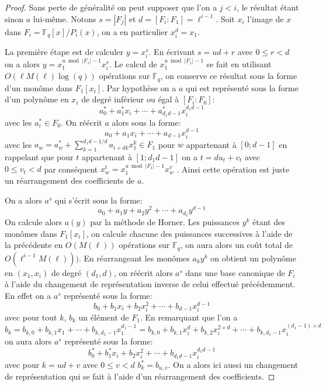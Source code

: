 \documentclass[10pt,a4paper]{book}
\theoremstyle{plain}
\theoremstyle{definition}
\theoremstyle{definition}
\theoremstyle{definition}
\theoremstyle{definition}
\theoremstyle{remark}
\theoremstyle{remark}
\begin{document}
\begin{proof}
Sans perte de généralité on peut supposer que l'on a $j<i$, le résultat étant sinon $a$ lui-même. Notons $s= |F_j|$ et $d=[F_i:F_1]=\ell^{i-1}$. Soit $x_i$ l'image de $x$ dans $F_i=\mathbb{F}_q[x]/P_i(x)$, on a en particulier $x_i^d=x_1$.

La première étape est de calculer $y=x_i^s$. En écrivant $s=ud+r$ avec $0 \leqslant r < d$ on a alors $y=x_1^{u \bmod |F_1|-1}x_i^r$. Le calcul de $x_1^{u \bmod |F_1|-1}$ se fait en utilisant $O(\ell M(\ell) \log(q))$ opérations sur $\mathbb{F}_q$, on conserve ce résultat sous la forme d'un monôme dans $F_1[x_i]$. Par hypothèse on a $a$ qui est représenté sous la forme d'un polynôme en $x_i$ de degré inférieur ou égal à $[F_i:F_0]$: 
\begin{equation*}
a^*_0+a_1^*x_i+ \cdots + a^*_{d_1d-1}x_i^{d_1d-1}
\end{equation*}
avec les $a_i^* \in F_0$. On réécrit $a$ alors sous la forme:
\begin{equation*}
a_0+a_1x_i+ \cdots + a_{d-1}x_i^{d-1}
\end{equation*}
avec les $a_w=a_w^* + \sum_{k=1}^{d_1d-1/d}a_{i+dk}x_1^k \in F_1$ pour $w$ appartenant à $[0; d-1]$ en rappelant que pour $t$ appartenant à $[1; d_1d-1]$ on a $t=d u_t+v_t$ avec $0 \leqslant v_t<d$ par conséquent $x_w^t=x_1^{u \bmod |F_1|-1}x_w^{v}$ . Ainsi cette opération est juste un réarrangement des coefficients de $a$.

On a alors $a^s$ qui s'écrit sous la forme:
\begin{equation*}
a_0 + a_1 y + a_2 y^2 + \cdots + a_{d_1}y^{d-1}
\end{equation*}
On calcule alors $a(y)$ par la méthode de Horner. Les puissances $y^k$ étant des monômes dans $F_1[x_i]$, on calcule chacune des puissances successives à l'aide de la précédente en $O(M(\ell))$ opérations sur $\mathbb{F}_q$, on aura alors un coût total de $O(\ell^{i-1}M(\ell)))$. En réarrangeant les monômes $a_k y^k$ on obtient un polynôme en $(x_1,x_i)$ de degré $(d_1,d)$, on réécrit alors $a^s$ dans une base canonique de $F_i$ à l'aide du changement de représentation inverse de celui effectué précédemment. En effet on a $a^s$ représenté sous la forme:
\begin{equation*}
b_0 + b_1 x_i + b_2 x_i^2 + \cdots + b_{d-1}x_i^{d-1}
\end{equation*}
avec pour tout $k$, $b_k$ un élément de $F_1$. En remarquant que l'on a 
\begin{equation*}
 b_k=b_{k,0} + b_{k,1}x_1 + \cdots + b_{k,d_1-1} x_1^{d_1-1}=b_{k,0} + b_{k,1}x_i^d + b_{k,2} x_i^{2 \times d} + \cdots + b_{k,d_1-1} x_i^{(d_1-1)\times d} 
\end{equation*}
on aura alors $a^s$ représenté sous la forme:
\begin{equation*}
b_0^* + b_1^* x_i + b_2 x_i^2 + \cdots + b_{d_1d-1} x_i^{d_1d-1}
\end{equation*}
avec pour $k=ud+v$ avec $0 \leqslant v < d$ $b_k^*=b_{u,v}$. On a alors ici aussi un changement de représentation qui se fait à l'aide d'un réarrangement des coefficients.
\end{proof}
\end{document}
